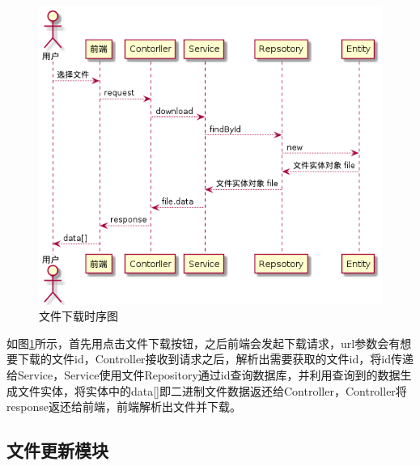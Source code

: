 \begin{figure}[ht]
    \centering
    \includegraphics[scale = 0.6]{out/uml/时序图/file-download-sequence/file-download-sequence.png}
    \caption{\song\wuhao 文件下载时序图}
    \label{file-download-sequence}
\end{figure}

如图\ref{file-download-sequence}所示，首先用点击文件下载按钮，之后前端会发起下载请求，url参数会有想要下载的文件id，Controller接收到请求之后，解析出需要获取的文件id，将id传递给Service，Service使用文件Repository通过id查询数据库，并利用查询到的数据生成文件实体，将实体中的data[]即二进制文件数据返还给Controller，Controller将response返还给前端，前端解析出文件并下载。

\subsection{文件更新模块}

